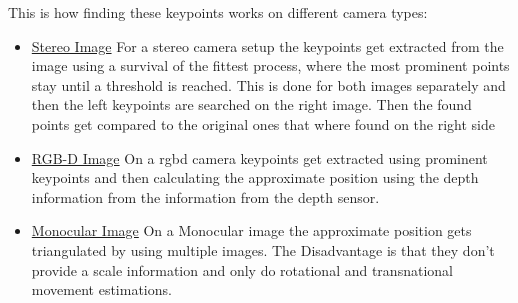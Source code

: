This is how finding these keypoints works on different camera types:
\begin{itemize}
    \item \underline{Stereo Image} \newline
    For a stereo camera setup the keypoints get extracted from the image using a survival of the fittest process, where the most prominent points stay until a threshold is reached. This is done for both images separately and then the left keypoints are searched on the right image. Then the found points get compared to the original ones that where found on the right side
    \item \underline{RGB-D Image} \newline
    On a \gls{rgbd} camera keypoints get extracted using prominent keypoints and then calculating the approximate position using the depth information from the information from the depth sensor.
    \item \underline{Monocular Image} \newline
    On a Monocular image the approximate position gets triangulated by using multiple images. The Disadvantage is that they don't provide a scale information and only do rotational and transnational movement estimations.
\end{itemize}

